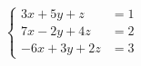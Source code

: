\begin{equation}
\begin{cases}
3x + 5y + z &= 1 \\
7x - 2y + 4z &= 2 \\
-6x + 3y + 2z &= 3
\end{cases}
\end{equation}